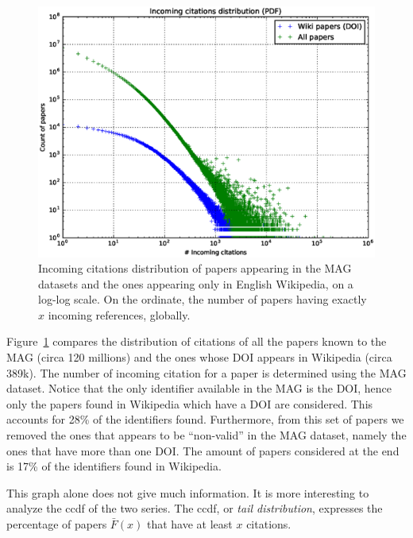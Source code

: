 \begin{figure}[h]
\centering
\includegraphics[keepaspectratio=true, width=\textwidth]{assets/incoming_citations_distribution_pdf}
\caption{Incoming citations distribution of papers appearing in the \ac{MAG} datasets and the ones appearing only in English Wikipedia, on a log-log scale.
On the ordinate, the number of papers having exactly $x$ incoming references, globally.}
\label{fig:incoming_citations_distribution_pdf}
\end{figure}

Figure~\ref{fig:incoming_citations_distribution_pdf} compares the distribution of citations of all the papers known to the MAG (circa 120 millions) and the ones whose \ac{DOI} appears in Wikipedia (circa 389k).
The number of incoming citation for a paper is determined using the \ac{MAG} dataset.
Notice that the only identifier available in the \ac{MAG} is the \ac{DOI}, hence only the papers found in Wikipedia which have a \ac{DOI} are considered.
This accounts for 28\% of the identifiers found.
Furthermore, from this set of papers we removed the ones that appears to be ``non-valid'' in the \ac{MAG} dataset, namely the ones that have more than one \ac{DOI}.
The amount of papers considered at the end is 17\% of the identifiers found in Wikipedia.

This graph alone does not give much information.
It is more interesting to analyze the \ac{ccdf} of the two series.
The \ac{ccdf}, or \emph{tail distribution}, expresses the percentage of papers $\bar{F}(x)$ that have at least $x$ citations.

